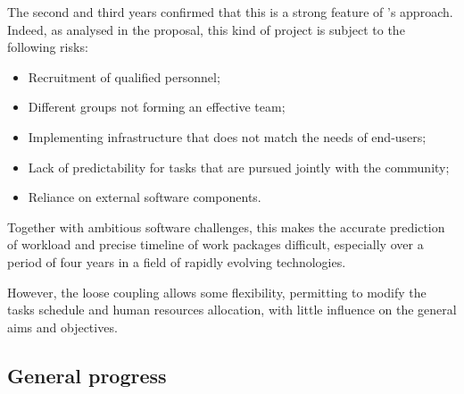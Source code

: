 The second and third years confirmed that this is a strong feature of \ODK's
approach. Indeed, as analysed in the proposal, this kind of project is
subject to the following risks:
\begin{itemize}
\item Recruitment of qualified personnel;
\item Different groups not forming an effective team;
\item Implementing infrastructure that does not match the needs of end-users;
\item Lack of predictability for tasks that are pursued jointly with
  the community;
\item Reliance on external software components.
\end{itemize}
Together with ambitious software challenges, this makes the accurate
prediction of workload and precise timeline of work packages
difficult, especially over a period of four years in a field of
rapidly evolving technologies.

However, the loose coupling allows some flexibility,
permitting to modify the tasks schedule and human resources allocation,
with little influence on the general aims and objectives.

\subsection{General progress}

